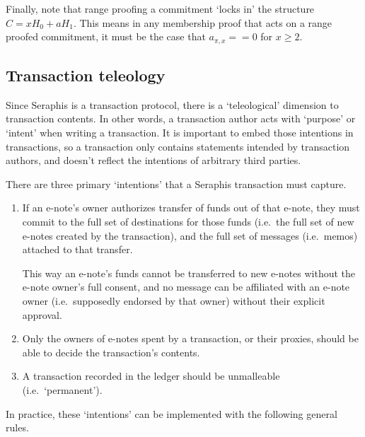 Finally, note that range proofing a commitment `locks in' the structure $C = x H_0 + a H_1$. This means in any membership proof that acts on a range proofed commitment, it must be the case that $a_{\pi,x} == 0$ for $x \geq 2$.


\subsection{Transaction teleology}
\label{subsec:seraphis-tx-teleology}

Since Seraphis is a transaction protocol, there is a `teleological' dimension to transaction contents. In other words, a transaction author acts with `purpose' or `intent' when writing a transaction. It is important to embed those intentions in transactions, so a transaction only contains statements intended by transaction authors, and doesn't reflect the intentions of arbitrary third parties.

There are three primary `intentions' that a Seraphis transaction must capture.

\begin{enumerate}
    \item If an e-note's owner authorizes transfer of funds out of that e-note, they must commit to the full set of destinations for those funds (i.e.\ the full set of new e-notes created by the transaction), and the full set of messages (i.e.\ memos) attached to that transfer.

    This way an e-note's funds cannot be transferred to new e-notes without the e-note owner's full consent, and no message can be affiliated with an e-note owner (i.e.\ supposedly endorsed by that owner) without their explicit approval.

    \item Only the owners of e-notes spent by a transaction, or their proxies, should be able to decide the transaction's contents.

    \item A transaction recorded in the ledger should be unmalleable (i.e.\ `permanent').
\end{enumerate}

In practice, these `intentions' can be implemented with the following general rules.

